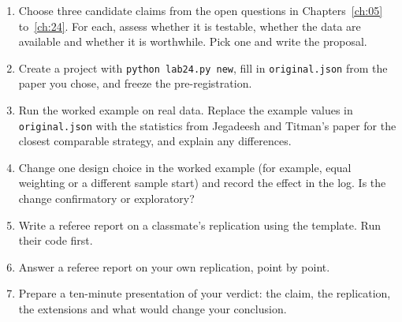 \begin{enumerate}
  \item Choose three candidate claims from the open questions in Chapters~\ref{ch:05} to~\ref{ch:24}. For each, assess whether it is testable, whether the data are available and whether it is worthwhile. Pick one and write the proposal.
  \item Create a project with \texttt{python lab24.py new}, fill in \texttt{original.json} from the paper you chose, and freeze the pre-registration.
  \item {\sloppy Run the worked example on real data. Replace the example values in \texttt{original.json} with the statistics from Jegadeesh and Titman's paper for the closest comparable strategy, and explain any differences.\par}
  \item Change one design choice in the worked example (for example, equal weighting or a different sample start) and record the effect in the log. Is the change confirmatory or exploratory?
  \item Write a referee report on a classmate's replication using the template. Run their code first.
  \item Answer a referee report on your own replication, point by point.
  \item Prepare a ten-minute presentation of your verdict: the claim, the replication, the extensions and what would change your conclusion.
\end{enumerate}
